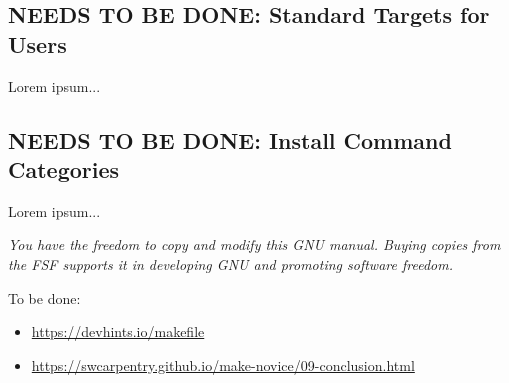 \documentclass{charun}
\begin{document}
\begin{multicols*}{2}
\color{gray}
\subsection{NEEDS TO BE DONE: Standard Targets for Users}
Lorem ipsum...
\color{black}

\color{gray}
\subsection{NEEDS TO BE DONE: Install Command Categories}
Lorem ipsum...
\color{black}



\emph{You have the freedom to copy and modify this GNU manual. Buying copies from the FSF supports it in developing GNU and promoting software freedom.}
\end{multicols*}

To be done:
\begin{itemize}
    \item \url{https://devhints.io/makefile}
    \item \url{https://swcarpentry.github.io/make-novice/09-conclusion.html}
\end{itemize}
\end{document}
